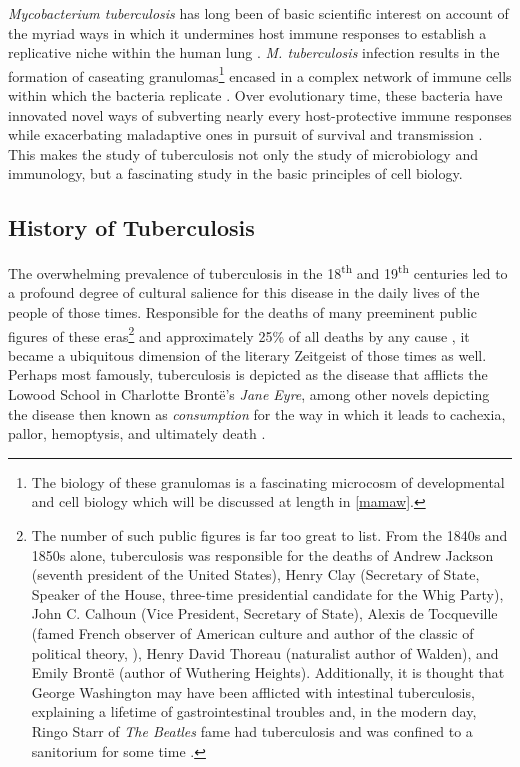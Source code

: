 \textit{Mycobacterium tuberculosis} has long been of basic scientific interest on account of the myriad ways in which it undermines host immune responses to establish a replicative niche within the human lung \citep{Baxt2013, Yu2019, Nguyen2009, Stanley2003, Monack2004, Hmama2015}. \textit{M. tuberculosis} infection results in the formation of caseating granulomas\footnote{The biology of these granulomas is a fascinating microcosm of developmental and cell biology which will be discussed at length in \autoref{mamaw}.} encased in a complex network of immune cells within which the bacteria replicate \citep{Pagan2018}. Over evolutionary time, these bacteria have innovated novel ways of subverting nearly every host\hyp{}protective immune responses while exacerbating maladaptive ones in pursuit of survival and transmission \citep{Ernst2012, Rahman2020, Chandra2022, Guan2021}. This makes the study of tuberculosis not only the study of microbiology and immunology, but a fascinating study in the basic principles of cell biology. 

\subsection{History of Tuberculosis}\label{tbhistory}

The overwhelming prevalence of tuberculosis in the 18\textsuperscript{th} and 19\textsuperscript{th} centuries led to a profound degree of cultural salience for this disease in the daily lives of the people of those times. Responsible for the deaths of many preeminent public figures of these eras\footnote{The number of such public figures is far too great to list. From the 1840s and 1850s alone, tuberculosis was responsible for the deaths of Andrew Jackson (seventh president of the United States), Henry Clay (Secretary of State, Speaker of the House, three\hyp{}time presidential candidate for the Whig Party), John C. Calhoun (Vice President, Secretary of State), Alexis de Tocqueville (famed French observer of American culture and author of the classic of political theory, ), Henry David Thoreau (naturalist author of Walden), and Emily Bront\"{e} (author of Wuthering Heights). Additionally, it is thought that George Washington may have been afflicted with intestinal tuberculosis, explaining a lifetime of gastrointestinal troubles \citep{Chernow2010} and, in the modern day, Ringo Starr of \textit{The Beatles} fame had tuberculosis and was confined to a sanitorium for some time \citep{Starr2016}.} and approximately 25\% of all deaths by any cause \citep{CDC2016}, it became a ubiquitous dimension of the literary Zeitgeist of those times as well. Perhaps most famously, tuberculosis is depicted as the disease that afflicts the Lowood School in Charlotte Bront\"{e}'s \textit{Jane Eyre}, among other novels depicting the disease then known as \textit{consumption} for the way in which it leads to cachexia, pallor, hemoptysis, and ultimately death \citep{Bronte1847, Loddenkemper2015}.

